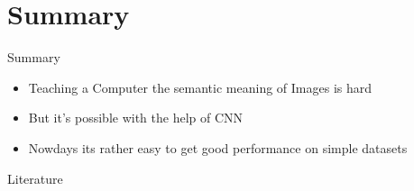 \documentclass[citestyle=authoryear,bibstyle=numeric,hyperref,backend=biber]{sdqbeamer}
\begin{document}
\section{Summary}
\begin{frame}{Summary}
\begin{itemize}
    \item Teaching a Computer the semantic meaning of Images is hard
    \pause
    \item But it's possible with the help of CNN
    \pause
    \item Nowdays its rather easy to get good performance on simple datasets
\end{itemize}
\end{frame}

\appendix
\beginbackup

\begin{frame}{Literature}
\nocite{*} %
\printbibliography
\end{frame}
\end{document}
